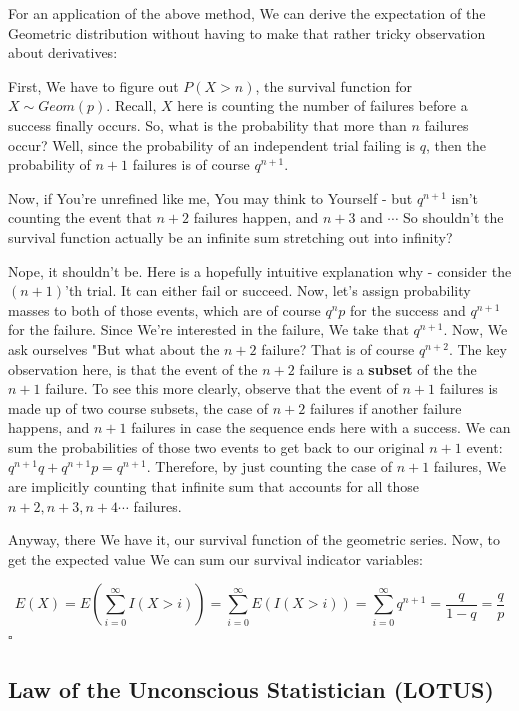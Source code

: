 \documentclass{article}
\newcommand{\qed}{\hfill$\square$}
\begin{document}
		For an application of the above method, We can derive the expectation of the Geometric distribution without having to make that rather tricky observation about derivatives:
		
		First, We have to figure out $P(X > n)$, the survival function for $X \sim Geom(p)$. Recall, $X$ here is counting the number of failures before a success finally occurs. So, what is the probability that more than $n$ failures occur? Well, since the probability of an independent trial failing is $q$, then the probability of $n+1$ failures is of course $q^{n+1}$.
		
		Now, if You're unrefined like me, You may think to Yourself - but $q^{n+1}$ isn't counting the event that $n+2$ failures happen, and $n+3$ and $\cdots$ So shouldn't the survival function actually be an infinite sum stretching out into infinity?
		
		Nope, it shouldn't be. Here is a hopefully intuitive explanation why - consider the $(n+1)$'th trial. It can either fail or succeed. Now, let's assign probability masses to both of those events, which are of course $q^np$ for the success and $q^{n+1}$ for the failure. Since We're interested in the failure, We take that $q^{n+1}$. Now, We ask ourselves "But what about the $n+2$ failure? That is of course $q^{n+2}$. The key observation here, is that the event of the $n+2$ failure is a \textbf{subset} of the the $n+1$ failure. To see this more clearly, observe that the event of $n+1$ failures is made up of two course subsets, the case of $n+2$ failures if another failure happens, and $n+1$ failures in case the sequence ends here with a success. We can sum the probabilities of those two events to get back to our original $n+1$ event: $q^{n+1}q + q^{n+1}p = q^{n+1}$. Therefore, by just counting the case of $n+1$ failures, We are implicitly counting that infinite sum that accounts for all those $n+2, n+3, n+4 \cdots$ failures.
		
		Anyway, there We have it, our survival function of the geometric series. Now, to get the expected value We can sum our survival indicator variables:
		
		$$E(X) = E\left( \sum^\infty_{i=0} I(X > i) \right) = \sum^\infty_{i=0} E(I(X > i)) = \sum^\infty_{i=0} q^{n+1} = \frac{q}{1-q} = \frac{q}{p}$$\qed
		
	\subsection{Law of the Unconscious Statistician (LOTUS)} 
		
\end{document}
